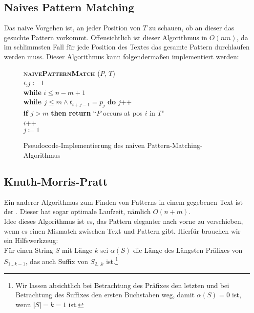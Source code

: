 \subsection{Naives Pattern Matching}
Das naive Vorgehen ist, an jeder Position von \( T \) zu schauen, ob an dieser das gesuchte Pattern vorkommt. Offensichtlich ist dieser Algorithmus in \( O(nm) \), da im schlimmsten Fall für jede Position des Textes das gesamte Pattern durchlaufen werden muss. Dieser Algorithmus kann folgendermaßen implementiert werden:
\begin{figure}[H]
  \begin{pseudocode}
    \textbf{\textsc{naivePatternMatch}} (\( P \), \( T \)) \\
    \( i \),\( j \coloneqq 1 \) \\
    \textbf{while} \( i \leq n-m+1 \) \\
    \phantom{\enskip} \textbf{while \( j \leq m \wedge t_{i+j-1} = p_j \)} \textbf{do} \( j \)++ \\
    \phantom{\enskip} \textbf{if \( j > m \)} \textbf{then return} ``\( P \) occurs at pos \( i \) in \( T \)'' \\
    \phantom{\enskip} \( i \)++ \\
    \phantom{\enskip} \( j \coloneqq 1 \)
  \end{pseudocode}
  \caption{Pseudocode-Implementierung des naiven Pattern-Matching-Algorithmus}
\end{figure}

\subsection{Knuth-Morris-Pratt}
Ein anderer Algorithmus zum Finden von Patterns in einem gegebenen Text ist der \label{def:kmpAlgorithmus}. Dieser hat sogar optimale Laufzeit, nämlich \( O(n+m) \). \\
Idee dieses Algorithmus ist es, das Pattern eleganter nach vorne zu verschieben, wenn es einen Mismatch zwischen Text und Pattern gibt. Hierfür brauchen wir ein Hilfswerkzeug: \\
Für einen String \( S \) mit Länge \( k \) sei \( \alpha(S) \) die Länge des Längsten Präfixes von \( S_{1\dots k-1} \), das auch Suffix von \( S_{2\dots k} \) ist.\footnote{Wir lassen absichtlich bei Betrachtung des Präfixes den letzten und bei Betrachtung des Suffixes den ersten Buchstaben weg, damit \( \alpha(S) = 0 \) ist, wenn \( \left\vert S \right\vert = k = 1 \) ist.} 

